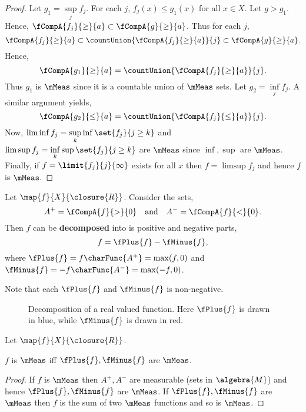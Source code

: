\begin{proof}
    Let $g_1 = \sup\limits_{j}f_j$. For each $j$, $f_j(x) \leq g_1(x)$ for all $x \in X$. Let $g > g_1$.
    Hence, $\fCompA{f_j}{\geq}{a} \subset \fCompA{g}{\geq}{a}$. Thus for each $j$,
    \[\fCompA{f_j}{\geq}{a} \subset \countUnion{\fCompA{f_j}{\geq}{a}}{j}\subset \fCompA{g}{\geq}{a}.\]
    Hence,
    \[\fCompA{g_1}{\geq}{a} = \countUnion{\fCompA{f_j}{\geq}{a}}{j}.\]
    Thus $g_1$ is $\mMeas$ since it is a countable union of $\mMeas$ sets.
    Let $g_2 = \inf\limits_j f_j$. A similar argument yields,
    \[\fCompA{g_2}{\leq}{a} = \countUnion{\fCompA{f_j}{\leq}{a}}{j}.\]
    Now, $\liminf f_j = \sup\limits_{k}\inf\set{f_j}{j\geq k}$ and $\limsup f_j =
    \inf\limits_{k}\sup\set{f_j}{j\geq k}$ are $\mMeas$ since $\inf,\sup$ are $\mMeas$.
    Finally, if $f = \limit{f_j}{j}{\infty}$ exists for all $x$ then $f = \limsup f_j$ and hence $f$ is
    $\mMeas$.
\end{proof}
\begin{Definition}[name=Decomposition of real valued functions]
    Let $\map{f}{X}{\closure{R}}$. 
    Consider the sets, \[A^{+} = \fCompA{f}{>}{0} \quad \text{and} \quad A^{-} = \fCompA{f}{<}{0}.\]
    Then $f$ can be \textbf{decomposed} into is positive and negative parts, 
    \[f = \fPlus{f} - \fMinus{f},\]
    where $\fPlus{f} = f\charFunc{A^{+}} = \max(f,0)$ and 
    $\fMinus{f} = -f\charFunc{A^{-}} = \max(-f,0)$.
\end{Definition}
Note that each $\fPlus{f}$ and $\fMinus{f}$ is non-negative.
\begin{figure}
  
  \caption{Decomposition of a real valued function. Here $\fPlus{f}$ is drawn in blue,
  while $\fMinus{f}$ is drawn in red.}\label{fig:tikz:decomposition_f}
\end{figure}
\begin{Proposition}\label{prop:prop3_mfunc_decomposition}
    Let $\map{f}{X}{\closure{R}}$.
    \begin{properties}[resume*=mfunc]
    \item
	$f$ is $\mMeas$ iff $\fPlus{f},\fMinus{f}$ are $\mMeas$.
    \end{properties}
\end{Proposition}
\begin{proof}
    If $f$ is $\mMeas$ then $A^{+},A^{-}$ are measurable (sets in $\algebra{M}$) and hence
    $\fPlus{f},\fMinus{f}$ are $\mMeas$. 
    If $\fPlus{f},\fMinus{f}$ are $\mMeas$ then $f$ is the sum of two
    $\mMeas$ functions and so is $\mMeas$. 
\end{proof}
